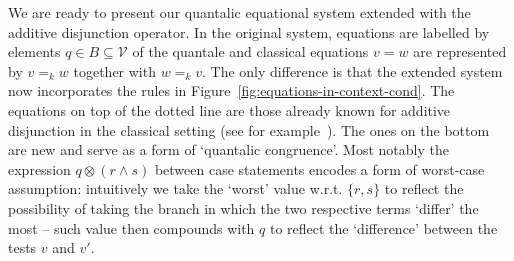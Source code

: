 \documentclass[a4paper,UKenglish,cleveref, autoref, thm-restate]{lipics-v2021}
\begin{document}
We are ready to present our quantalic equational system extended with the
additive disjunction operator.  In the original system, equations are labelled
by elements $q \in B \subseteq \mathcal{V}$ of the quantale and classical
equations $v = w$ are represented by $v =_k w$ together with $w =_k v$. The
only difference is that the extended system now incorporates the rules in
Figure~\ref{fig:equations-in-context-cond}. The equations on top of the dotted
line are those already known for additive disjunction in the classical setting
(see for example~\cite{croleCategoriesTypes1994}). The ones on the bottom are
new and serve as a form of `quantalic congruence'. Most notably the expression
$q \otimes (r \wedge s)$ between case statements encodes a form of worst-case
assumption: intuitively we take the `worst' value w.r.t. $\{r, s\}$ to reflect
the possibility of taking the branch in which the two respective terms `differ'
the most -- such value then compounds with $q$ to reflect the `difference'
between the tests $v$ and $v'$.
\end{document}
